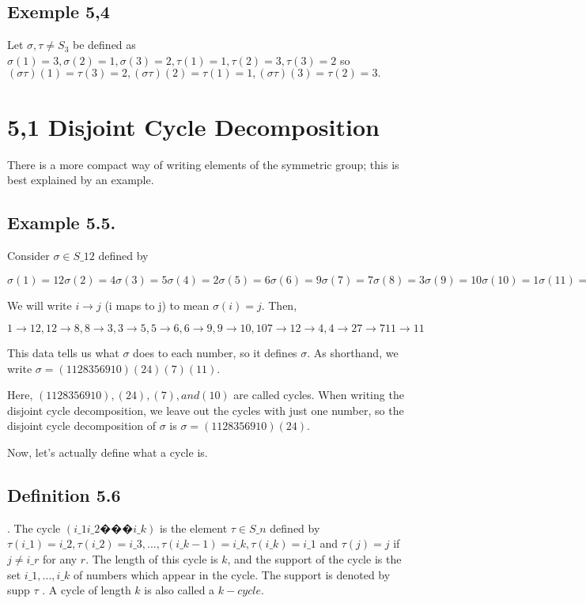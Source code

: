 \subsection{Exemple 5,4}

Let $\sigma,\tau \neq S_3$ be defined as $\sigma(1)=3, \sigma(2)=1, \sigma(3)=2, \tau(1)=1,\tau(2)=3,\tau(3)=2$ so $(\sigma\tau)(1)=\tau(3)=2,(\sigma\tau)(2)=\tau(1)=1, (\sigma\tau)(3)=\tau(2)=3.$

\section{5,1 Disjoint Cycle Decomposition}

There is a more compact way of writing elements of the symmetric group; this is best explained by an
example.

\subsection{Example 5.5.} Consider $\sigma \in S\_12$ defined by

	$\sigma(1) = 12 \sigma(2) = 4 \sigma(3) = 5 \sigma(4) = 2 \sigma(5) = 6 \sigma(6) = 9
	\sigma(7) = 7 \sigma(8) = 3 \sigma(9) = 10 \sigma(10) = 1 \sigma(11) = 11 \sigma(12) = 8$

We will write $i \rightarrow j$ (i maps to j) to mean $\sigma(i) = j$. Then,

	$1 \rightarrow 12, 12 \rightarrow 8, 8 \rightarrow 3, 3 \rightarrow 5, 5 \rightarrow 6, 6 \rightarrow 9, 9 \rightarrow 10, 10 7\rightarrow 1
	2 \rightarrow 4, 4 \rightarrow 2
	7 \rightarrow 7
	11 \rightarrow 11$


This data tells us what $\sigma$ does to each number, so it defines $\sigma$. As shorthand, we write
$\sigma = (1 12 8 3 5 6 9 10) (2 4) (7) (11).$

Here, $(1 12 8 3 5 6 9 10), (2 4), (7), and (10)$ are called cycles. When writing the disjoint cycle decomposition,
we leave out the cycles with just one number, so the disjoint cycle decomposition of $\sigma$ is
$\sigma = (1 12 8 3 5 6 9 10) (2 4).$ 

Now, let's actually define what a cycle is.

\subsection{Definition 5.6}. The cycle $(i\_1 i\_2 � � � i\_k)$ is the element $\tau \in S\_n$ defined by $\tau(i\_1) = i\_2, \tau(i\_2) = i\_3, . . . , \tau(i\_k -1) =
i\_k, \tau(i\_k) = i\_1$ and $\tau(j) = j$ if $j \neq i\_r$ for any $r$. The length of this cycle is $k$, and the support of the cycle
is the set ${i\_1, . . . , i\_k}$ of numbers which appear in the cycle. The support is denoted by supp $\tau$ . A cycle of
length $k$ is also called a $k-cycle$.

